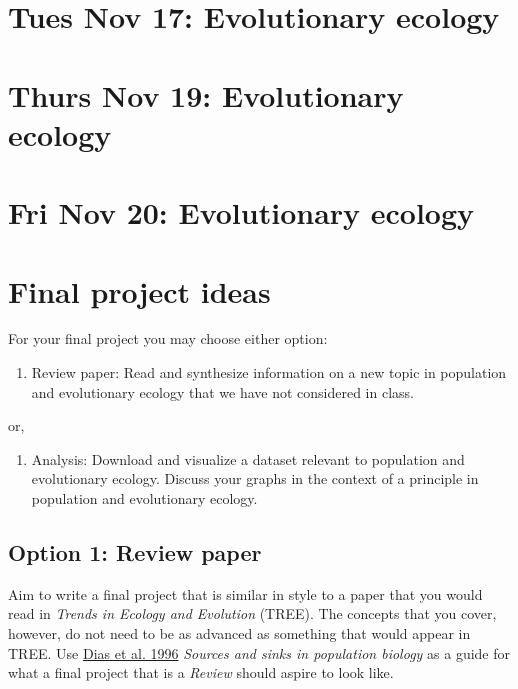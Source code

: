 \documentclass[]{book}
\providecommand{\tightlist}{%
  \setlength{\itemsep}{0pt}\setlength{\parskip}{0pt}}
\begin{document}
\chapter{Tues Nov 17: Evolutionary
ecology}\label{tues-nov-17-evolutionary-ecology}

\chapter{Thurs Nov 19: Evolutionary
ecology}\label{thurs-nov-19-evolutionary-ecology}

\chapter{Fri Nov 20: Evolutionary
ecology}\label{fri-nov-20-evolutionary-ecology}

\chapter{Final project ideas}\label{final-project-ideas}

For your final project you may choose either option:

\begin{enumerate}
\def\labelenumi{\arabic{enumi}.}
\tightlist
\item
  Review paper: Read and synthesize information on a new topic in
  population and evolutionary ecology that we have not considered in
  class.
\end{enumerate}

or,

\begin{enumerate}
\def\labelenumi{\arabic{enumi}.}
\setcounter{enumi}{1}
\tightlist
\item
  Analysis: Download and visualize a dataset relevant to population and
  evolutionary ecology. Discuss your graphs in the context of a
  principle in population and evolutionary ecology.
\end{enumerate}

\section{Option 1: Review paper}\label{option-1-review-paper}

Aim to write a final project that is similar in style to a paper that
you would read in \emph{Trends in Ecology and Evolution} (TREE). The
concepts that you cover, however, do not need to be as advanced as
something that would appear in TREE. Use
\href{https://www-sciencedirect-com.qe2a-proxy.mun.ca/science/article/pii/0169534796100379?via\%3Dihub}{Dias
et al. 1996} \emph{Sources and sinks in population biology} as a guide
for what a final project that is a \emph{Review} should aspire to look
like.
\end{document}

